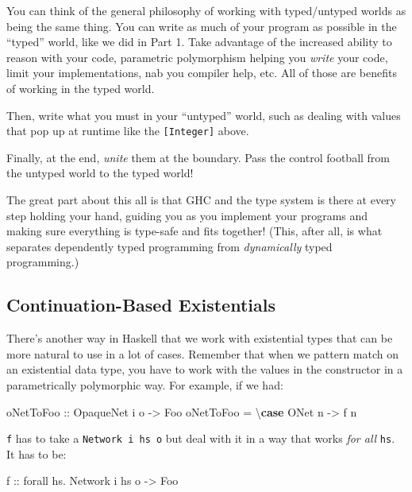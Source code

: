 \documentclass[]{article}
\newenvironment{Shaded}{}{}
\newcommand{\KeywordTok}[1]{\textcolor[rgb]{0.00,0.44,0.13}{\textbf{{#1}}}}
\newcommand{\DataTypeTok}[1]{\textcolor[rgb]{0.56,0.13,0.00}{{#1}}}
\newcommand{\OtherTok}[1]{\textcolor[rgb]{0.00,0.44,0.13}{{#1}}}
\newcommand{\FunctionTok}[1]{\textcolor[rgb]{0.02,0.16,0.49}{{#1}}}
\newcommand{\NormalTok}[1]{{#1}}
\begin{document}
You can think of the general philosophy of working with typed/untyped worlds as
being the same thing. You can write as much of your program as possible in the
``typed'' world, like we did in Part 1. Take advantage of the increased ability
to reason with your code, parametric polymorphism helping you \emph{write} your
code, limit your implementations, nab you compiler help, etc. All of those are
benefits of working in the typed world.

Then, write what you must in your ``untyped'' world, such as dealing with values
that pop up at runtime like the \texttt{{[}Integer{]}} above.

Finally, at the end, \emph{unite} them at the boundary. Pass the control
football from the untyped world to the typed world!

The great part about this all is that GHC and the type system is there at every
step holding your hand, guiding you as you implement your programs and making
sure everything is type-safe and fits together! (This, after all, is what
separates dependently typed programming from \emph{dynamically} typed
programming.)

\subsection{Continuation-Based
Existentials}\label{continuation-based-existentials}

There's another way in Haskell that we work with existential types that can be
more natural to use in a lot of cases. Remember that when we pattern match on an
existential data type, you have to work with the values in the constructor in a
parametrically polymorphic way. For example, if we had:

\begin{Shaded}
\begin{Highlighting}[]
\OtherTok{oNetToFoo ::} \DataTypeTok{OpaqueNet} \NormalTok{i o }\OtherTok{->} \DataTypeTok{Foo}
\NormalTok{oNetToFoo }\FunctionTok{=} \NormalTok{\textbackslash{}}\KeywordTok{case} \DataTypeTok{ONet} \NormalTok{n }\OtherTok{->} \NormalTok{f n}
\end{Highlighting}
\end{Shaded}

\texttt{f} has to take a \texttt{Network\ i\ hs\ o} but deal with it in a way
that works \emph{for all} \texttt{hs}. It has to be:

\begin{Shaded}
\begin{Highlighting}[]
\OtherTok{f ::} \NormalTok{forall hs}\FunctionTok{.} \DataTypeTok{Network} \NormalTok{i hs o }\OtherTok{->} \DataTypeTok{Foo}
\end{Highlighting}
\end{Shaded}
\end{document}
